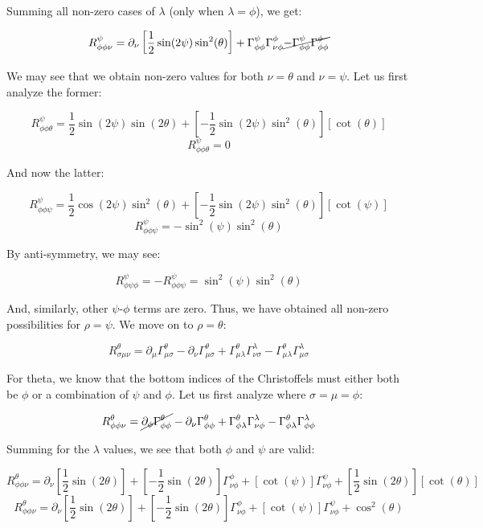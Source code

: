 \begin{enumerate}
\begin{enumerate}
        Summing all non-zero cases of $\lambda$ (only when $\lambda=\phi$), we get:

        $$R^{\psi}_{\phi\phi\nu}=\partial_{\nu}\left[ \frac{1}{2}\sin(2\psi)\sin^2(\theta) \right]+\Gamma^{\psi}_{\phi\phi}\Gamma^{\phi}_{\nu\phi}\cancel{-\Gamma^{\psi}_{\phi\phi}\Gamma^{\phi}_{\phi\phi}}$$

        We may see that we obtain non-zero values for both $\nu=\theta$ and $\nu=\psi$. Let us first analyze the former:

        $$R^{\psi}_{\phi\phi\theta}=\frac{1}{2}\sin(2\psi)\sin(2\theta)+\left[ -\frac{1}{2}\sin(2\psi)\sin^2(\theta) \right][\cot(\theta)]$$
        $$R^{\psi}_{\phi\phi\theta}=0$$

        And now the latter:

        $$R^{\psi}_{\phi\phi\psi}=\frac{1}{2}\cos(2\psi)\sin^2(\theta)+\left[ -\frac{1}{2}\sin(2\psi)\sin^2(\theta) \right][\cot(\psi)]$$
        $$R^{\psi}_{\phi\phi\psi}=-\sin^2(\psi)\sin^2(\theta)$$

        By anti-symmetry, we may see:

        $$\boxed{R^{\psi}_{\phi\psi\phi}=-R^{\psi}_{\phi\phi\psi}=\sin^2(\psi)\sin^2(\theta)}$$

        And, similarly, other $\psi$-$\phi$ terms are zero. Thus, we have obtained all non-zero possibilities for $\rho=\psi$. We move on to $\rho=\theta$:

        $$R^{\theta}_{\sigma\mu\nu}=\partial_{\mu}\Gamma^{\theta}_{\mu\sigma}-\partial_{\nu}\Gamma^{\theta}_{\mu\sigma}+\Gamma^{\theta}_{\mu\lambda}\Gamma^{\lambda}_{\nu\sigma}-\Gamma^{\theta}_{\mu\lambda}\Gamma^{\lambda}_{\mu\sigma}$$

        For theta, we know that the bottom indices of the Christoffels must either both be $\phi$ or a combination of $\psi$ and $\phi$. Let us first analyze where $\sigma=\mu=\phi$:

        $$R^{\theta}_{\phi\phi\nu}=\cancel{\partial_{\phi}\Gamma^{\theta}_{\phi\phi}}-\partial_{\nu}\Gamma^{\theta}_{\phi\phi}+\Gamma^{\theta}_{\phi\lambda}\Gamma^{\lambda}_{\nu\phi}-\Gamma^{\theta}_{\phi\lambda}\Gamma^{\lambda}_{\phi\phi}$$

        Summing for the $\lambda$ values, we see that both $\phi$ and $\psi$ are valid:

        $$R^{\theta}_{\phi\phi\nu}=\partial_{\nu}\left[ \frac{1}{2}\sin(2\theta) \right]+\left[ -\frac{1}{2}\sin(2\theta) \right]\Gamma^{\phi}_{\nu\phi}+[\cot(\psi)]\Gamma^{\psi}_{\nu\phi}+\left[ \frac{1}{2}\sin(2\theta) \right][\cot(\theta)]$$
        $$R^{\theta}_{\phi\phi\nu}=\partial_{\nu}\left[ \frac{1}{2}\sin(2\theta) \right]+\left[ -\frac{1}{2}\sin(2\theta) \right]\Gamma^{\phi}_{\nu\phi}+[\cot(\psi)]\Gamma^{\psi}_{\nu\phi}+\cos^2(\theta)$$


\end{enumerate}
\end{enumerate}
